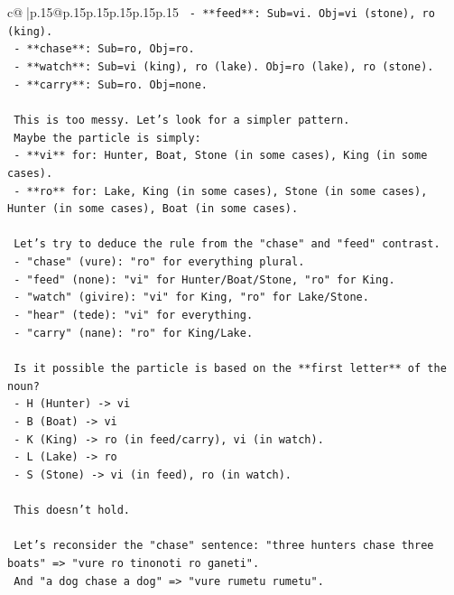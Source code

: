 \documentclass{article}
\begin{document}
{\begin{supertabular}{c@{$\;$}|p{.15\linewidth}@{}p{.15\linewidth}p{.15\linewidth}p{.15\linewidth}p{.15\linewidth}p{.15\linewidth}}
{{{\texttt{    {-} **feed**: Sub=vi. Obj=vi (stone), ro (king).} \\
\texttt{    {-} **chase**: Sub=ro, Obj=ro.} \\
\texttt{    {-} **watch**: Sub=vi (king), ro (lake). Obj=ro (lake), ro (stone).} \\
\texttt{    {-} **carry**: Sub=ro. Obj=none.} \\
\\ 
\texttt{    This is too messy. Let's look for a simpler pattern.} \\
\texttt{    Maybe the particle is simply:} \\
\texttt{    {-} **vi** for: Hunter, Boat, Stone (in some cases), King (in some cases).} \\
\texttt{    {-} **ro** for: Lake, King (in some cases), Stone (in some cases), Hunter (in some cases), Boat (in some cases).} \\
\\ 
\texttt{    Let's try to deduce the rule from the "chase" and "feed" contrast.} \\
\texttt{    {-} "chase" (vure): "ro" for everything plural.} \\
\texttt{    {-} "feed" (none): "vi" for Hunter/Boat/Stone, "ro" for King.} \\
\texttt{    {-} "watch" (givire): "vi" for King, "ro" for Lake/Stone.} \\
\texttt{    {-} "hear" (tede): "vi" for everything.} \\
\texttt{    {-} "carry" (nane): "ro" for King/Lake.} \\
\\ 
\texttt{    Is it possible the particle is based on the **first letter** of the noun?} \\
\texttt{    {-} H (Hunter) {-}> vi} \\
\texttt{    {-} B (Boat) {-}> vi} \\
\texttt{    {-} K (King) {-}> ro (in feed/carry), vi (in watch).} \\
\texttt{    {-} L (Lake) {-}> ro} \\
\texttt{    {-} S (Stone) {-}> vi (in feed), ro (in watch).} \\
\\ 
\texttt{    This doesn't hold.} \\
\\ 
\texttt{    Let's reconsider the "chase" sentence: "three hunters chase three boats" => "vure ro tinonoti ro ganeti".} \\
\texttt{    And "a dog chase a dog" => "vure rumetu rumetu".} \\
}}}
\end{supertabular}}
\end{document}
